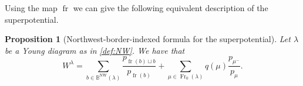 \documentclass{amsart}
\newtheorem{proposition}[thm]{Proposition}
\theoremstyle{definition}
\newtheorem{defn}[thm]{Definition}
\numberwithin{equation}{section}
\newcommand{\mutilde}{\tilde{\mu}}
\def\NW{\operatorname{NW}}
\newcommand{\BB}{{\mathbb B}}
\newcommand{\Fr}{\operatorname{Fr}}
\newcommand{\frozen}{\operatorname{fr}}
\begin{document}

Using the map $\frozen$ we can give the following equivalent description of the superpotential.

\begin{proposition}[Northwest-border-indexed formula for the superpotential]
\label{p:3rdpotential}
Let $\lambda$ be a Young diagram  as in 
\cref{def:NW}.
We have that 
	\begin{equation}\label{eq:3rdpotential}
		W^{\lambda} = \sum_{b\in \BB^{\NW}(\lambda)}  \frac{p_{\frozen(b) \sqcup b}}{p_{\frozen(b)}} +  \sum_{\mu\in \Fr_0(\lambda)} q(\mu)\frac{p_{\mu^-}}{p_{\mu}}.
	\end{equation}
\end{proposition}
\end{document}
